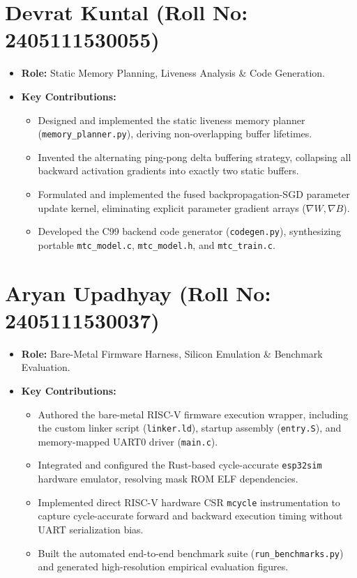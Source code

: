 \documentclass[12pt,a4paper]{report}
\begin{document}
\section{Devrat Kuntal (Roll No: 2405111530055)}
\begin{itemize}
    \item \textbf{Role:} Static Memory Planning, Liveness Analysis \& Code Generation.
    \item \textbf{Key Contributions:}
    \begin{itemize}
        \item Designed and implemented the static liveness memory planner (\texttt{memory\_planner.py}), deriving non-overlapping buffer lifetimes.
        \item Invented the alternating ping-pong delta buffering strategy, collapsing all backward activation gradients into exactly two static buffers.
        \item Formulated and implemented the fused backpropagation-SGD parameter update kernel, eliminating explicit parameter gradient arrays ($\nabla W, \nabla B$).
        \item Developed the C99 backend code generator (\texttt{codegen.py}), synthesizing portable \texttt{mtc\_model.c}, \texttt{mtc\_model.h}, and \texttt{mtc\_train.c}.
    \end{itemize}
\end{itemize}

\section{Aryan Upadhyay (Roll No: 2405111530037)}
\begin{itemize}
    \item \textbf{Role:} Bare-Metal Firmware Harness, Silicon Emulation \& Benchmark Evaluation.
    \item \textbf{Key Contributions:}
    \begin{itemize}
        \item Authored the bare-metal RISC-V firmware execution wrapper, including the custom linker script (\texttt{linker.ld}), startup assembly (\texttt{entry.S}), and memory-mapped UART0 driver (\texttt{main.c}).
        \item Integrated and configured the Rust-based cycle-accurate \texttt{esp32sim} hardware emulator, resolving mask ROM ELF dependencies.
        \item Implemented direct RISC-V hardware CSR \texttt{mcycle} instrumentation to capture cycle-accurate forward and backward execution timing without UART serialization bias.
        \item Built the automated end-to-end benchmark suite (\texttt{run\_benchmarks.py}) and generated high-resolution empirical evaluation figures.
    \end{itemize}
\end{itemize}
\end{document}
